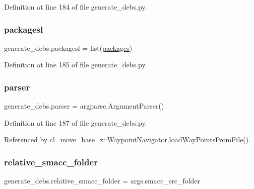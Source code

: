 Definition at line 184 of file generate\+\_\+debs.\+py.

\mbox{\label{namespacegenerate__debs_acac340506bc1d8ca0d0881b9c00bfea2}} 
\subsubsection{\texorpdfstring{packagesl}{packagesl}}
{\footnotesize\ttfamily generate\+\_\+debs.\+packagesl = list(\hyperlink{namespacegenerate__debs_a40d4732827c5678f3f48354238245e1d}{packages})}



Definition at line 185 of file generate\+\_\+debs.\+py.

\mbox{\label{namespacegenerate__debs_a4a9ae4bb85fc62d7973ea3d09ced6c26}} 
\subsubsection{\texorpdfstring{parser}{parser}}
{\footnotesize\ttfamily generate\+\_\+debs.\+parser = argparse.\+Argument\+Parser()}



Definition at line 187 of file generate\+\_\+debs.\+py.



Referenced by cl\+\_\+move\+\_\+base\+\_\+z\+::\+Waypoint\+Navigator.\+load\+Way\+Points\+From\+File().

\mbox{\label{namespacegenerate__debs_abf6925bd06ac1da3981fe638eefb5a61}} 
\subsubsection{\texorpdfstring{relative\+\_\+smacc\+\_\+folder}{relative\_smacc\_folder}}
{\footnotesize\ttfamily generate\+\_\+debs.\+relative\+\_\+smacc\+\_\+folder = args.\+smacc\+\_\+src\+\_\+folder}



